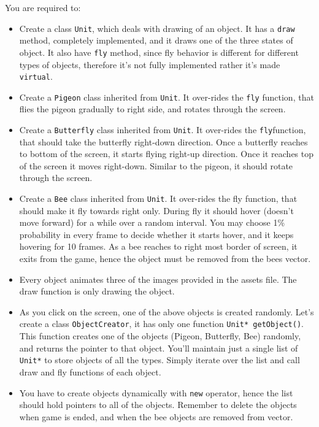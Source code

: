 \documentclass[a4paper,12pt]{article}
\begin{document}
	 You are required to:
	 \begin{itemize}
	 	\item Create a class \texttt{Unit}, which deals with drawing of an object. It has a \texttt{draw} method, completely implemented, and it draws one of the three states of object. It also have \texttt{fly} method, since fly behavior is different for different types of objects, therefore it's not fully implemented rather it's made \texttt{virtual}.
	 	
	 	\item Create a \texttt{Pigeon} class inherited from \texttt{Unit}. It over-rides the \texttt{fly} function, that flies the pigeon gradually to right side, and rotates through the screen. 
	 	
	 	\item Create a \texttt{Butterfly} class inherited from \texttt{Unit}. It over-rides the \texttt{fly}function, that should take the butterfly right-down direction. Once a butterfly reaches to bottom of the screen, it starts flying right-up direction. Once it reaches top of the screen it moves right-down. Similar to the pigeon, it should rotate through the screen. 
	 	
	 	\item Create a \texttt{Bee} class inherited from \texttt{Unit}. It over-rides the fly function, that should make it fly towards right only. During fly it should hover (doesn't move forward) for a while over a random interval. You may choose 1\% probability in every frame to decide whether it starts hover, and it keeps hovering for 10 frames. As a bee reaches to right most border of screen, it exits from the game, hence the object must be removed from the bees vector.  
	 	
	 	\item Every object animates three of the images provided in the assets file. The draw function is only drawing the object.
	 	
	 	\item As you click on the screen, one of the above objects is created randomly. Let's create a class \texttt{ObjectCreator}, it has only one function \texttt{Unit* getObject()}. This function creates one of the objects (Pigeon, Butterfly, Bee) randomly, and returns the pointer to that object. You'll maintain just a single list of \texttt{Unit*} to store objects of all the types. Simply iterate over the list and call draw and fly functions of each object. 
	 	
	 	\item You have to create objects dynamically with \texttt{new} operator, hence the list should hold pointers to all of the objects. Remember to delete the objects when game is ended, and when the bee objects are removed from vector.
	 	

\end{itemize}
\end{document}
